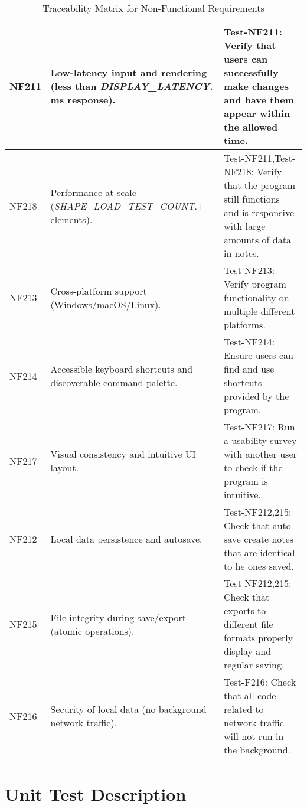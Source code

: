 \documentclass[12pt, titlepage]{article}
\begin{document}
\begin{table}[htbp]
\centering
\caption{Traceability Matrix for Non-Functional Requirements}
\begin{tabular}{|p{2.5cm}|p{6cm}|p{6cm}|}
\hline
NF211 & Low-latency input and rendering (less than \textit{DISPLAY\_LATENCY}. ms response). & Test-NF211: Verify that users can successfully make changes and have them appear within the allowed time. \\
\hline
NF218 & Performance at scale (\textit{SHAPE\_LOAD\_TEST\_COUNT}.+ elements). & Test-NF211,Test-NF218: Verify that the program still functions and is responsive with large amounts of data in notes. \\
\hline
NF213 & Cross-platform support (Windows/macOS/Linux). & Test-NF213: Verify program functionality on multiple different platforms. \\
\hline
NF214 & Accessible keyboard shortcuts and discoverable command palette. & Test-NF214: Ensure users can find and use shortcuts provided by the program. \\
\hline
NF217 & Visual consistency and intuitive UI layout. & Test-NF217: Run a usability survey with another user to check if the program is intuitive. \\
\hline
NF212 & Local data persistence and autosave. & Test-NF212,215: Check that auto save  create notes that are identical to he ones saved. \\
\hline
NF215 & File integrity during save/export (atomic operations). & Test-NF212,215: Check that exports to different file formats properly display and regular saving. \\
\hline
NF216 & Security of local data (no background network traffic). & Test-F216: Check that all code related to network traffic will not run in the background. \\
\hline
\end{tabular}
\end{table}



\section{Unit Test Description}


\end{document}
